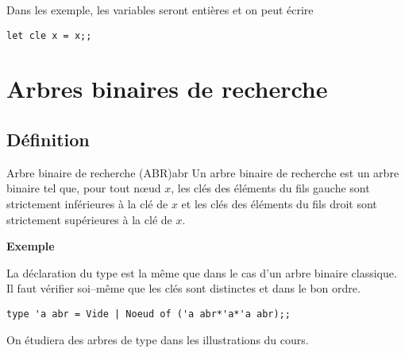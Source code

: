Dans les exemple, les variables seront entières et on peut écrire
\begin{lstlisting}
let cle x = x;;
\end{lstlisting} 
\newpage
\section{Arbres binaires de recherche}
\subsection{Définition}
\begin{defin}{Arbre binaire de recherche (ABR)}{abr}
Un arbre binaire de recherche est un arbre binaire tel que,  pour tout nœud $x$,  les clés des éléments du fils gauche sont strictement inférieures à la clé de $x$ et les clés des éléments du fils droit sont strictement supérieures à la clé de $x$.
\end{defin}

{\bf Exemple}

\begin{center}
\end{center}

La déclaration du type est la même que dans le cas d'un arbre binaire classique. Il faut vérifier soi--même que les clés sont distinctes et dans le bon ordre.

\begin{lstlisting}
type 'a abr = Vide | Noeud of ('a abr*'a*'a abr);; 
\end{lstlisting} 
On étudiera des arbres de type  dans les illustrations du cours.

